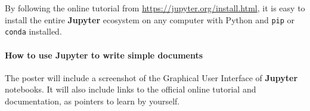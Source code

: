 \documentclass[runningheads]{llncs}
\newcommand{\Jupyter}{\textbf{Jupyter}}
\begin{document}
By following the online tutorial from \url{https://jupyter.org/install.html}, it is easy to install the entire \Jupyter{} ecosystem on any computer with Python and \texttt{pip} or \texttt{conda} installed.


\paragraph{How to use \Jupyter{} to write simple documents}

The poster will include a screenshot of the Graphical User Interface of \Jupyter{} notebooks.
It will also include links to the official online tutorial and documentation, as pointers to learn by yourself.






\end{document}
